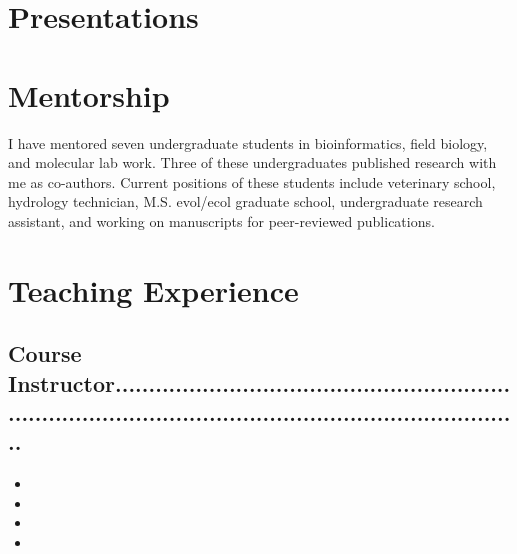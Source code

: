\documentclass[11pt,a4paper,sans]{moderncv}        %
\begin{document}
\section{Presentations}
\begin{refsection}
\nocite{*}
\printbibliography[heading=none]
\end{refsection}

\section{Mentorship}
I have mentored seven undergraduate students in bioinformatics, field biology, and molecular lab work. Three of these undergraduates published research with me as co-authors. Current positions of these students include veterinary school, hydrology technician, M.S. evol/ecol graduate school, undergraduate research assistant, and working on manuscripts for peer-reviewed publications.

\section{Teaching Experience}
\subsection{{Course Instructor}\footnotesize{........................................................................................................................................}}
\begin{itemize}
\item{}
\item{}
    \item{}
    \item{}
\end{itemize}
\end{document}
